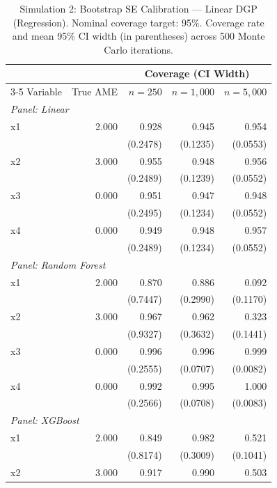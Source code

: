 \documentclass[12pt,a4paper]{article}
\numberwithin{equation}{section}
\theoremstyle{plain}
\theoremstyle{definition}
\begin{document}
	\begin{table}[htbp]
		\centering
		\footnotesize
		\begin{threeparttable}
			\caption{Simulation 2: Bootstrap SE Calibration --- Linear DGP (Regression). Nominal coverage target: 95\%. Coverage rate and mean 95\% CI width (in parentheses) across 500 Monte Carlo iterations.}
			\label{tab:sim2_calibration_regression_linear}
			\begin{tabular}{lrrrr}
				\toprule
				& & \multicolumn{3}{c}{Coverage (CI Width)} \\
				\cmidrule(lr){3-5}
				Variable & True AME & $n=250$ & $n=1,000$ & $n=5,000$ \\
				\midrule
				\multicolumn{5}{l}{\textit{Panel: Linear}} \\
				\quad x1 & 2.000 & 0.928 & 0.945 & 0.954 \\
				&  & (0.2478) & (0.1235) & (0.0553) \\
				\quad x2 & 3.000 & 0.955 & 0.948 & 0.956 \\
				&  & (0.2489) & (0.1239) & (0.0552) \\
				\quad x3 & 0.000 & 0.951 & 0.947 & 0.948 \\
				&  & (0.2495) & (0.1234) & (0.0552) \\
				\quad x4 & 0.000 & 0.949 & 0.948 & 0.957 \\
				&  & (0.2489) & (0.1234) & (0.0552) \\
				\midrule
				\multicolumn{5}{l}{\textit{Panel: Random Forest}} \\
				\quad x1 & 2.000 & 0.870 & 0.886 & 0.092 \\
				&  & (0.7447) & (0.2990) & (0.1170) \\
				\quad x2 & 3.000 & 0.967 & 0.962 & 0.323 \\
				&  & (0.9327) & (0.3632) & (0.1441) \\
				\quad x3 & 0.000 & 0.996 & 0.996 & 0.999 \\
				&  & (0.2555) & (0.0707) & (0.0082) \\
				\quad x4 & 0.000 & 0.992 & 0.995 & 1.000 \\
				&  & (0.2566) & (0.0708) & (0.0083) \\
				\midrule
				\multicolumn{5}{l}{\textit{Panel: XGBoost}} \\
				\quad x1 & 2.000 & 0.849 & 0.982 & 0.521 \\
				&  & (0.8174) & (0.3009) & (0.1041) \\
				\quad x2 & 3.000 & 0.917 & 0.990 & 0.503 \\

\end{tabular}
\end{threeparttable}
\end{table}
\end{document}

